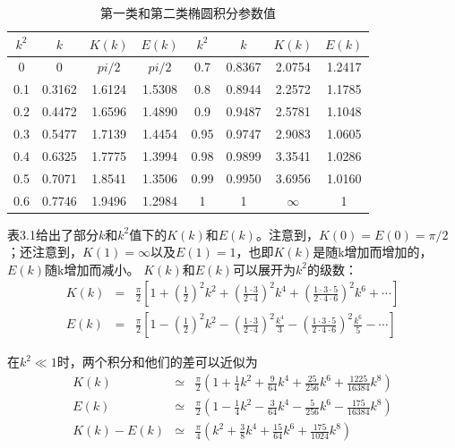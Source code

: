 \begin{table}
\centering
\caption{第一类和第二类椭圆积分参数值}
\label{my-label}
\begin{tabular}{|c|c|c|c|c|c|c|c|}
\hline
$k^2$    & $k$  & $K(k)$ &$E(k)$  &$k^2$  & $k$ &$K(k)$  &$E(k)$  \\ \hline
0   & 0 &$pi/2$  & $pi/2$ &0.7&0.8367  &2.0754  & 1.2417 \\ \hline
0.1 & 0.3162  & 1.6124 &1.5308  &0.8& 0.8944 & 2.2572 & 1.1785 \\ \hline
0.2 & 0.4472  & 1.6596 &1.4890  &0.9&0.9487  & 2.5781 & 1.1048 \\ \hline
0.3 & 0.5477  & 1.7139 & 1.4454 &0.95&0.9747  &2.9083  & 1.0605 \\ \hline
0.4 & 0.6325  & 1.7775 &1.3994  &0.98& 0.9899 & 3.3541 & 1.0286 \\ \hline
0.5 & 0.7071  & 1.8541 &1.3506  & 0.99& 0.9950 &3.6956  & 1.0160 \\ \hline
0.6 & 0.7746  & 1.9496 &1.2984  &1  &1  &$\infty$  &  1\\ \hline
\end{tabular}
\end{table}

表3.1给出了部分$k$和$k^2$值下的$K(k)$和$E(k)$。注意到，$K(0)=E(0)=\pi/2$；还注意到，$K(1)=\infty$以及$E(1)=1$，也即$K(k)$是随k增加而增加的，$E(k)$随k增加而减小。
$K(k)$和$E(k)$可以展开为$k^2$的级数：
\begin{eqnarray}
  K(k) &=& \frac{\pi}{2}[1+(\frac{1}{2})^2 k^2+(\frac{1\cdot 3}{2\cdot 4})^2 k^4+(\frac{1\cdot 3\cdot 5}{2\cdot 4\cdot 6})^2 k^6+\cdots] \\ \nonumber
  E(k) &=& \frac{\pi}{2}[1-(\frac{1}{2})^2 k^2-(\frac{1\cdot 3}{2\cdot 4})^2 \frac{k^4}{3}-(\frac{1\cdot 3\cdot 5}{2\cdot 4\cdot 6})^2 \frac{k^6}{5}-\cdots]
  \end{eqnarray}

在$k^2\ll 1$时，两个积分和他们的差可以近似为
\begin{eqnarray}
  K(k) &\simeq&  \frac{\pi}{2}(1+\frac{1}{4}k^2+\frac{9}{64}k^4+\frac{25}{256}k^6+\frac{1225}{16384}k^8)\\ \nonumber
  E(k) &\simeq&  \frac{\pi}{2}(1-\frac{1}{4}k^2-\frac{3}{64}k^4-\frac{5}{256}k^6-\frac{175}{16384}k^8)\\ \nonumber
  K(k)-E(k) &\simeq& \frac{\pi}{4}(k^2+\frac{3}{8}k^4+\frac{15}{64}k^6+\frac{175}{1024}k^8) 
\end{eqnarray}

